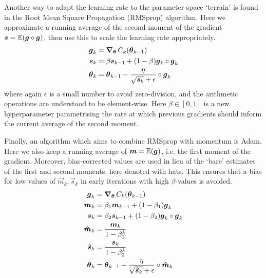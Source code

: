         Another way to adapt the learning rate to the parameter space `terrain' is found in the Root Mean Square Propagation (RMSprop) algorithm. Here we approximate a running average of the second moment of the gradient $\boldsymbol{s} = \operatorname{\mathbb{E}}(\boldsymbol{g} \circ \boldsymbol{g})$, then use this to scale the learning rate appropriately.
        \begin{subequations}
            \begin{align}
                \boldsymbol{g}_k &= \operatorname{\operatorname{\boldsymbol{\nabla}}_{\boldsymbol{\theta}}} C_k(\boldsymbol{\theta}_{k-1}) \\
                \boldsymbol{s}_k &= \beta \boldsymbol{s}_{k-1} + (1-\beta) \boldsymbol{g}_k \circ \boldsymbol{g}_k \\
                \boldsymbol{\theta}_k &= \boldsymbol{\theta}_{k-1} - \frac{\eta}{\sqrt{\boldsymbol{s}_k}+\epsilon} \circ \boldsymbol{g}_k
            \end{align}
        \end{subequations}
        where again $\epsilon$ is a small number to avoid zero-division, and the arithmetic operations are understood to be element-wise. Here $\beta \in [0,1]$ is a new hyperparameter parametrising the rate at which previous gradients should inform the current average of the second moment.

        Finally, an algorithm which aims to combine RMSprop with momentum is Adam. Here we also keep a running average of $\boldsymbol{m} = \operatorname{\mathbb{E}}(\boldsymbol{g})$, i.e. the first moment of the gradient. Moreover, bias-corrected values are used in lieu of the `bare' estimates of the first and second moments, here denoted with hats. This ensures that a bias for low values of $\vec{m}_k, \vec{s}_k$ in early iterations with high $\beta$-values is avoided.
        \begin{subequations}
            \begin{align}
                \boldsymbol{g}_k &= \operatorname{\operatorname{\boldsymbol{\nabla}}_{\boldsymbol{\theta}}} C_k(\boldsymbol{\theta}_{k-1}) \\
                \boldsymbol{m}_k &= \beta_1 \boldsymbol{m}_{k-1} + (1-\beta_1) \boldsymbol{g}_k \\
                \boldsymbol{s}_k &= \beta_2 \boldsymbol{s}_{k-1} + (1-\beta_2) \boldsymbol{g}_k \circ \boldsymbol{g}_k \\
                \boldsymbol{\hat{m}}_k &= \frac{\boldsymbol{m}_k}{1-\beta_1^k} \\
                \boldsymbol{\hat{s}}_k &= \frac{\boldsymbol{s}_k}{1-\beta_2^k} \\
                \boldsymbol{\theta}_k &= \boldsymbol{\theta}_{k-1} - \frac{\eta}{\sqrt{\boldsymbol{\hat{s}}_k}+\epsilon} \circ \boldsymbol{\hat{m}}_k
            \end{align}
        \end{subequations}


